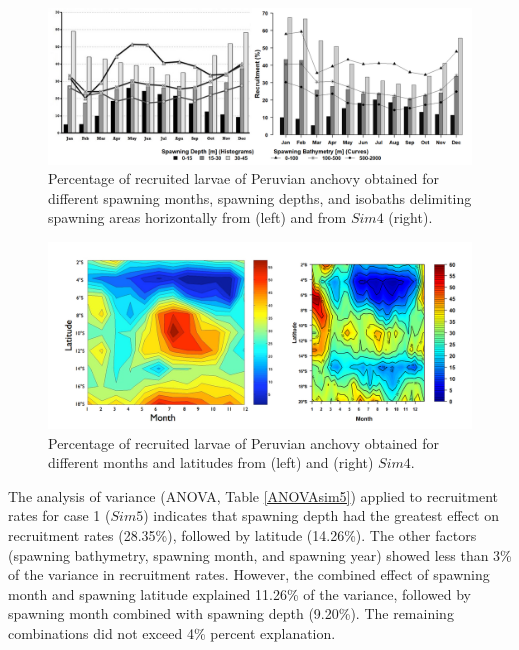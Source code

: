 \begin{figure}[H]
	\includegraphics[width=1.0\textwidth]{figures/Chap3BrocVSFloreBarplots.png}
	\centering
	\caption{Percentage of recruited larvae of Peruvian anchovy obtained for different spawning months, spawning depths, and isobaths delimiting spawning areas horizontally from \cite{BrocLett2008} (left) and from $Sim 4$ (right).}
	\label{Chap3BrocVSFloreBarplots}
\end{figure}

\begin{figure}[H]
	\includegraphics[width=1.0\textwidth]{figures/Chap3BrocVSFloreHovmuller.png}
	\centering
	\caption{Percentage of recruited larvae of Peruvian anchovy obtained for different months and latitudes from (left) \cite{BrocLett2008} and (right) $Sim 4$.}
	\label{Chap3BrocVSFloreHovmuller}
\end{figure}

The analysis of variance (ANOVA, Table \ref{ANOVAsim5}) applied to recruitment rates for case 1 ($Sim 5$) indicates that spawning depth had the greatest effect on recruitment rates (28.35\%), followed by latitude (14.26\%). The other factors (spawning bathymetry, spawning month, and spawning year) showed less than 3\% of the variance in recruitment rates. However, the combined effect of spawning month and spawning latitude explained 11.26\% of the variance, followed by spawning month combined with spawning depth (9.20\%). The remaining combinations did not exceed 4\% percent explanation.\\

